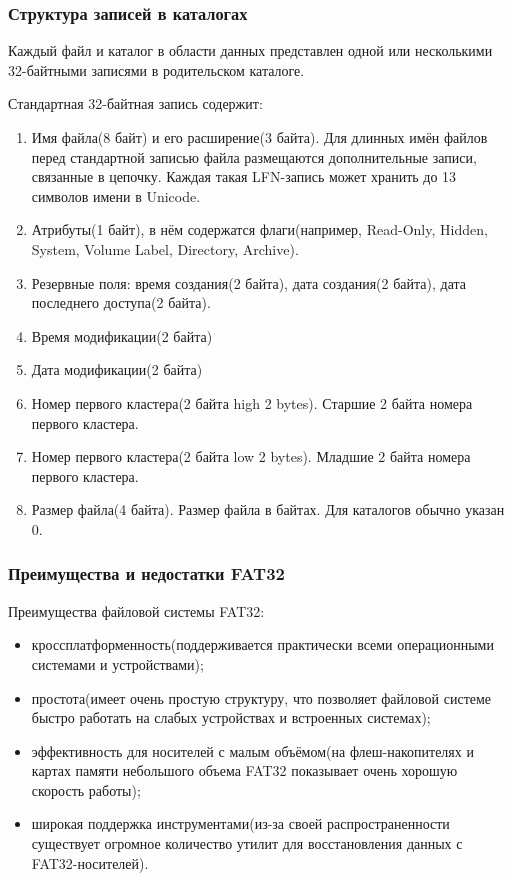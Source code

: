 \subsubsection{Структура записей в каталогах}

Каждый файл и каталог в области данных представлен одной или несколькими 32-байтными записями в родительском каталоге.

Стандартная 32-байтная запись содержит:

\begin{enumerate}
\item Имя файла(8 байт) и его расширение(3 байта). Для длинных имён файлов перед стандартной записью файла размещаются дополнительные записи, связанные в цепочку. Каждая такая LFN-запись может хранить до 13 символов имени в Unicode.
\item Атрибуты(1 байт), в нём содержатся флаги(например, Read-Only, Hidden, System, Volume Label, Directory, Archive).
\item Резервные поля: время создания(2 байта), дата создания(2 байта), дата последнего доступа(2 байта).
\item Время модификации(2 байта)
\item Дата модификации(2 байта)
\item Номер первого кластера(2 байта high 2 bytes). Старшие 2 байта номера первого кластера.
\item Номер первого кластера(2 байта low 2 bytes). Младшие 2 байта номера первого кластера.
\item Размер файла(4 байта). Размер файла в байтах. Для каталогов обычно указан 0.
\end{enumerate}

\subsubsection{Преимущества и недостатки FAT32}

Преимущества файловой системы FAT32:

\begin{itemize}
\item кроссплатформенность(поддерживается практически всеми операционными системами и устройствами);
\item простота(имеет очень простую структуру, что позволяет файловой системе быстро работать на слабых устройствах и встроенных системах);
\item эффективность для носителей с малым объёмом(на флеш-накопителях и картах памяти небольшого объема FAT32 показывает очень хорошую скорость работы);
\item широкая поддержка инструментами(из-за своей распространенности существует огромное количество утилит для восстановления данных с FAT32-носителей).
\end{itemize}


